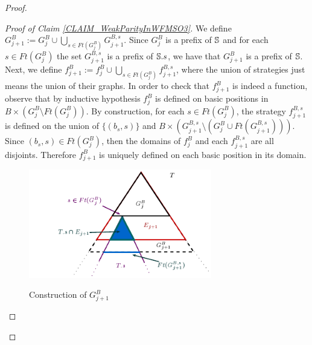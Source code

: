 \begin{proof}
\begin{Iff-LR}
\begin{proof}[Proof of Claim \ref{CLAIM_WeakParityInWFMSO3}]
We define $G_{j+1}^{B} := G_{j}^{B} \cup \bigcup_{s \in \mathit{Ft}(G^{B}_j)} G_{j+1}^{B,s}$. Since $G_{j}^{B}$ is a prefix of $\mathbb{S}$ and for each $s \in \mathit{Ft}(G^{B}_j)$ the set $G_{j+1}^{B,s}$ is a prefix of $\mathbb{S}.s$, we have that $G_{j+1}^{B}$ is a prefix of $\mathbb{S}$. Next, we define $f_{j+1}^{B} := f_j^{B} \cup \bigcup_{s \in \mathit{Ft}(G^{B}_j)} f_{j+1}^{B,s}$, where the union of strategies just means the union of their graphs. In order to check that $f_{j+1}^{B}$ is indeed a function, observe that by inductive hypothesis $f_j^{B}$ is defined on basic positions in $B \times (G_{j}^{B} \setminus \mathit{Ft}(G_{j}^{B}))$. By construction, for each $s \in \mathit{Ft}(G^{B}_j)$, the strategy $f_{j+1}^{B,s}$ is defined on the union of $\{(b_s,s)\}$ and $B \times (G_{j+1}^{B,s} \setminus (G_{j}^{B} \cup \mathit{Ft}(G_{j+1}^{B,s})))$. Since $(b_s,s) \in \mathit{Ft}(G_{j}^{B})$, then the domains of $f_j^{B}$ and each $f_{j+1}^{B,s}$ are all disjoints. Therefore $f_{j+1}^{B}$ is uniquely defined on each basic position in its domain.

\begin{figure}[h]
  \includegraphics[width=8cm]{appendix/FIG_PropBuchiToWFMSO.png}\\
  \caption{\rm Construction of $G_{j+1}^B$}\label{FIG_PropBuchiToWFMSO}
\end{figure}





\end{proof}
\end{Iff-LR}
\end{proof}

